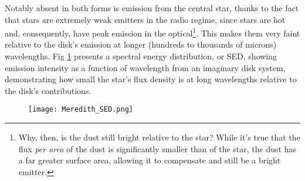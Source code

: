 Notably absent in both forms is emission from the central star, thanks to the fact that stars are extremely weak emitters in the radio regime, since stars are hot and, consequently, have peak emission in the optical\footnote{Why, then, is the dust still bright relative to the star? While it's true that the flux \textit{per area} of the dust is significantly smaller than of the star, the dust has a far greater surface area, allowing it to compensate and still be a bright emitter.}. This makes them very faint relative to the disk's emission at longer (hundreds to thousands of microns) wavelengths. Fig \ref{fig:SED} \citep{Hughes2010} presents a spectral energy distribution, or SED, showing emission intensity as a function of wavelength from an imaginary disk system, demonstrating how small the star's flux density is at long wavelengths relative to the disk's contributions.


\begin{figure}
\centering
  \texttt{[image: Meredith\_SED.png]}
  \label{fig:SED}
\end{figure}


